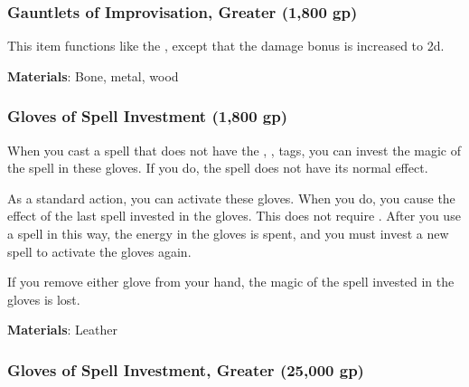 \lowercase{\hypertarget{item:Gauntlets of Improvisation, Greater}{}}\label{item:Gauntlets of Improvisation, Greater}
\hypertarget{item:Gauntlets of Improvisation, Greater}{\subsubsection{Gauntlets of Improvisation, Greater\hfill{} (1,800 gp)}}

This item functions like the , except that the damage bonus is increased to \plus2d.



\vspace{0.25em}
\textbf{Materials}: Bone, metal, wood


\lowercase{\hypertarget{item:Gloves of Spell Investment}{}}\label{item:Gloves of Spell Investment}
\hypertarget{item:Gloves of Spell Investment}{\subsubsection{Gloves of Spell Investment\hfill{} (1,800 gp)}}

When you cast a spell that does not have the , ,  tags,
you can invest the magic of the spell in these gloves.
If you do, the spell does not have its normal effect.

As a standard action, you can activate these gloves.
When you do, you cause the effect of the last spell invested in the gloves.
This does not require .
After you use a spell in this way, the energy in the gloves is spent, and you must invest a new spell to activate the gloves again.

If you remove either glove from your hand, the magic of the spell invested in the gloves is lost.



\vspace{0.25em}
\textbf{Materials}: Leather


\lowercase{\hypertarget{item:Gloves of Spell Investment, Greater}{}}\label{item:Gloves of Spell Investment, Greater}
\hypertarget{item:Gloves of Spell Investment, Greater}{\subsubsection{Gloves of Spell Investment, Greater\hfill{} (25,000 gp)}}

